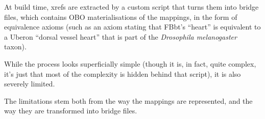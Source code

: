 \begin{frame}
{  At build time, xrefs are extracted by a custom script that turns them into
  bridge files, which contains OBO materialisations of the mappings, in the
  form of equivalence axioms (such as an axiom stating that FBbt's ``heart''
  is equivalent to a Uberon ``dorsal vessel heart'' that is part of the
  \emph{Drosophila melanogaster} taxon).

  While the process looks superficially simple (though it is, in fact, quite
  complex, it's just that most of the complexity is hidden behind that
  script), it is also severely limited.

  The limitations stem both from the way the mappings are represented, and the
  way they are transformed into bridge files.}

\end{frame}

